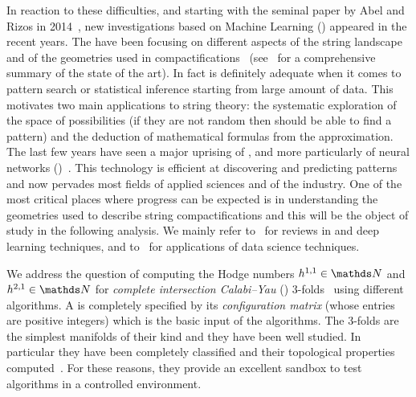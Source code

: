 In reaction to these difficulties, and starting with the seminal paper by Abel and Rizos in 2014~\cite{Abel:2014:GeneticAlgorithmsSearch}, new investigations based on Machine Learning (\ml) appeared in the recent years.
The have been focusing on different aspects of the string landscape and of the geometries used in compactifications~\cite{Krefl:2017:MachineLearningCalabiYau, Ruehle:2017:EvolvingNeuralNetworks, He:2017:MachinelearningStringLandscape, Carifio:2017:MachineLearningString, Altman:2019:EstimatingCalabiYauHypersurface, Bull:2018:MachineLearningCICY, Mutter:2019:DeepLearningHeterotic, Ashmore:2020:MachineLearningCalabiYau, Brodie:2020:MachineLearningLine, Bull:2019:GettingCICYHigh, Cole:2019:SearchingLandscapeFlux, Faraggi:2020:MachineLearningClassification, Halverson:2019:BranesBrainsExploring, Bizet:2020:TestingSwamplandConjectures, Halverson:2020:StatisticalPredictionsString, Krippendorf:2020:DetectingSymmetriesNeural, Otsuka:2020:DeepLearningKmeans, Parr:2020:ContrastDataMining, Parr:2020:PredictingOrbifoldOrigin} (see~\cite{Ruehle:2020:DataScienceApplications} for a comprehensive summary of the state of the art).
In fact \ml is definitely adequate when it comes to pattern search or statistical inference starting from large amount of data.
This motivates two main applications to string theory: the systematic exploration of the space of possibilities (if they are not random then \ml should be able to find a pattern) and the deduction of mathematical formulas from the \ml approximation.
The last few years have seen a major uprising of \ml, and more particularly of neural networks (\nn)~\cite{Goodfellow:2017:DeepLearning, Chollet:2018:DeepLearningPython, Geron:2019:HandsOnMachineLearning}.
This technology is efficient at discovering and predicting patterns and now pervades most fields of applied sciences and of the industry.
One of the most critical places where progress can be expected is in understanding the geometries used to describe string compactifications and this will be the object of study in the following analysis.
We mainly refer to~\cite{Geron:2019:HandsOnMachineLearning, Chollet:2018:DeepLearningPython, Goodfellow:2017:DeepLearning} for reviews in \ml and deep learning techniques, and to~\cite{Ruehle:2020:DataScienceApplications, Skiena:2017:DataScienceDesign, Zheng:2018:FeatureEngineeringMachine} for applications of data science techniques.

We address the question of computing the Hodge numbers $\hodge{1}{1} \in \N$ and $\hodge{2}{1} \in \N$ for \emph{complete intersection Calabi--Yau} (\cicy) $3$-folds~\cite{Green:1987:CalabiYauManifoldsComplete} using different \ml algorithms.
A \cicy is completely specified by its \emph{configuration matrix} (whose entries are positive integers) which is the basic input of the algorithms.
The \cicy $3$-folds are the simplest manifolds of their kind and they have been well studied.
In particular they have been completely classified and their topological properties computed~\cite{Candelas:1988:CompleteIntersectionCalabiYau, Green:1989:AllHodgeNumbers, Anderson:2017:FibrationsCICYThreefolds}.
For these reasons, they provide an excellent sandbox to test \ml algorithms in a controlled environment.


